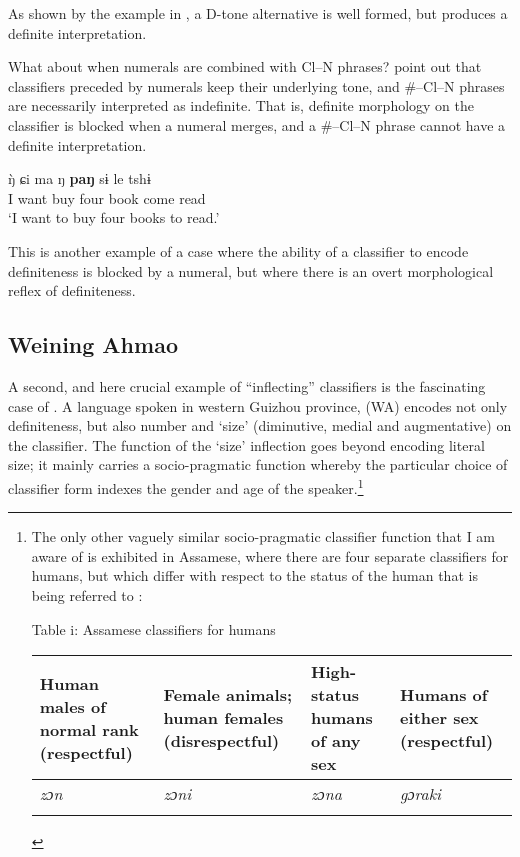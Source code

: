 \documentclass[output=paper
,modfonts
,nonflat]{langsci/langscibook}
\begin{document}
As shown by the example in , a D-tone alternative is well formed, but produces a definite interpretation. 

What about when numerals are combined with Cl--N phrases? \citet{ChengSybesma2005} point out that classifiers preceded by numerals keep their underlying tone, and \#--Cl--N phrases are necessarily interpreted as indefinite. That is, definite morphology on the classifier is blocked when a numeral merges, and a \#--Cl--N phrase cannot have a definite interpretation.

\ea 
\gll
{\`ŋ} ɕi ma ŋ \textbf{paŋ} sɨ le tshɨ\\
I want buy four {} book come read\\
\glt
`I want to buy four books to read.'\\
\z 

This is another example of a case where the ability of a classifier to encode definiteness is blocked by a numeral, but where there is an overt morphological reflex of definiteness. 

\subsection{Weining Ahmao} \label{sec:hall:4.2}\largerpage[2]

A second, and here crucial example of ``inflecting'' classifiers is the fascinating case of  \citep{GernerBisang2008,GernerBisang2010}. A  language spoken in western Guizhou province,  (WA) encodes not only definiteness, but also number and `size' (diminutive, medial and augmentative) on the classifier. The function of the `size' inflection goes beyond encoding literal size; it mainly carries a socio-pragmatic function whereby the particular choice of classifier form indexes the gender and age of the speaker.{\footnote{The only other vaguely similar socio-pragmatic classifier function that I am aware of is exhibited in Assamese, where there are four separate classifiers for humans, but which differ with respect to the status of the human that is being referred to \citep[102--103]{Aikhenvald2000}:

\vspace{.5\baselineskip}
{\centering Table i: Assamese classifiers for humans\\
\begin{tabularx}{0.96\textwidth}{QQQQ}
\lsptoprule
{\scriptsize Human males of normal rank (respectful)} & {\scriptsize Female animals; human females (disrespectful)} & {\scriptsize High-status humans of any sex} &{\scriptsize Humans of either sex (respectful)}\\
\midrule
\textit{zɔn}&\textit{zɔni}&\textit{zɔna}&\textit{gɔraki}\\
\lspbottomrule
\end{tabularx}}}}\pagebreak
\end{document}
